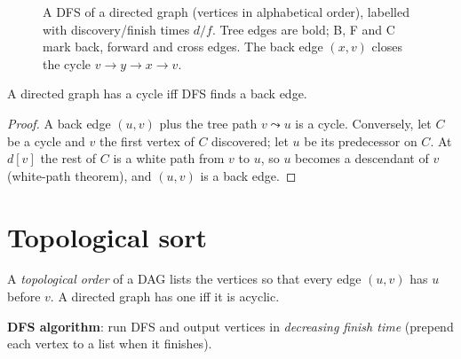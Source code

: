 \begin{figure}[H]
\centering
{}
\caption{A DFS of a directed graph (vertices in alphabetical order),
labelled with discovery/finish times $d/f$. Tree edges are bold; B, F and C
mark back, forward and cross edges. The back edge $(x,v)$ closes the cycle
$v\to y\to x\to v$.}
\end{figure}

\begin{lemma}
A directed graph has a cycle iff DFS finds a back edge.
\end{lemma}
\begin{proof}
A back edge $(u,v)$ plus the tree path $v\leadsto u$ is a cycle. Conversely, let $C$ be a cycle and $v$ the first vertex of $C$ discovered;
let $u$ be its predecessor on $C$. At $d[v]$ the rest of $C$ is a white path from $v$ to $u$, so $u$ becomes a descendant of $v$
(white-path theorem), and $(u,v)$ is a back edge.
\end{proof}

\section{Topological sort}
A \emph{topological order} of a DAG lists the vertices so that every edge $(u,v)$ has $u$ before $v$. A directed graph has one iff it is acyclic.

\textbf{DFS algorithm}: run DFS and output vertices in \emph{decreasing finish time} (prepend each vertex to a list when it finishes).

